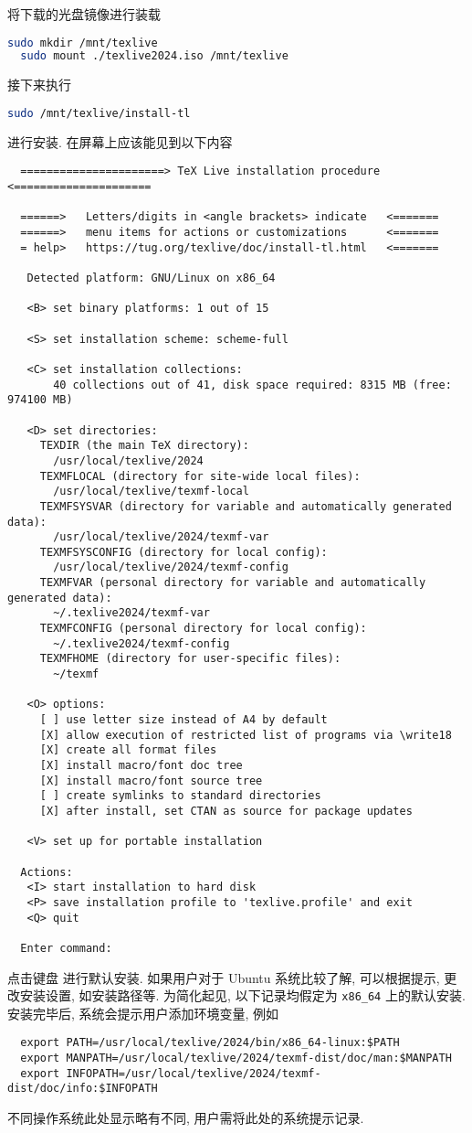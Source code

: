将下载的光盘镜像进行装载
\begin{lstlisting}[language = bash]
  sudo mkdir /mnt/texlive
  sudo mount ./texlive2024.iso /mnt/texlive
\end{lstlisting}
接下来执行
\begin{lstlisting}[language = bash]
  sudo /mnt/texlive/install-tl
\end{lstlisting}
进行安装.
在屏幕上应该能见到以下内容
\begin{lstlisting}
  ======================> TeX Live installation procedure <=====================

  ======>   Letters/digits in <angle brackets> indicate   <=======
  ======>   menu items for actions or customizations      <=======
  = help>   https://tug.org/texlive/doc/install-tl.html   <=======

   Detected platform: GNU/Linux on x86_64

   <B> set binary platforms: 1 out of 15

   <S> set installation scheme: scheme-full

   <C> set installation collections:
       40 collections out of 41, disk space required: 8315 MB (free: 974100 MB)

   <D> set directories:
     TEXDIR (the main TeX directory):
       /usr/local/texlive/2024
     TEXMFLOCAL (directory for site-wide local files):
       /usr/local/texlive/texmf-local
     TEXMFSYSVAR (directory for variable and automatically generated data):
       /usr/local/texlive/2024/texmf-var
     TEXMFSYSCONFIG (directory for local config):
       /usr/local/texlive/2024/texmf-config
     TEXMFVAR (personal directory for variable and automatically generated data):
       ~/.texlive2024/texmf-var
     TEXMFCONFIG (personal directory for local config):
       ~/.texlive2024/texmf-config
     TEXMFHOME (directory for user-specific files):
       ~/texmf

   <O> options:
     [ ] use letter size instead of A4 by default
     [X] allow execution of restricted list of programs via \write18
     [X] create all format files
     [X] install macro/font doc tree
     [X] install macro/font source tree
     [ ] create symlinks to standard directories
     [X] after install, set CTAN as source for package updates

   <V> set up for portable installation

  Actions:
   <I> start installation to hard disk
   <P> save installation profile to 'texlive.profile' and exit
   <Q> quit

  Enter command:
\end{lstlisting}
点击键盘  进行默认安装.
如果用户对于 Ubuntu 系统比较了解,
可以根据提示,
更改安装设置,
如安装路径等.
为简化起见,
以下记录均假定为 \texttt{x86\_64} 上的默认安装.
安装完毕后,
系统会提示用户添加环境变量,
例如
\begin{lstlisting}
  export PATH=/usr/local/texlive/2024/bin/x86_64-linux:$PATH
  export MANPATH=/usr/local/texlive/2024/texmf-dist/doc/man:$MANPATH
  export INFOPATH=/usr/local/texlive/2024/texmf-dist/doc/info:$INFOPATH
\end{lstlisting}
不同操作系统此处显示略有不同,
用户需将此处的系统提示记录.


